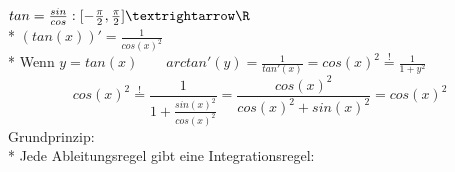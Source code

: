 {%
\bew
$tan=\frac{sin}{cos}:[-\frac{\pi}{2},\frac{\pi}{2}]→\R$\\*
$(tan(x))'=\frac{1}{cos(x)^2}$\\*
Wenn $y=tan(x)\qquad arctan'(y) = \frac{1}{tan'(x)}=cos(x)^2 \overset{!}{=} \frac{1}{1+y^2}$
$$cos(x)^2 \overset{!}{=} \frac{1}{1+\frac{sin(x)^2}{cos(x)^2}}=\frac{cos(x)^2}{cos(x)^2+sin(x)^2}=cos(x)^2$$\ok
}
Grundprinzip:\\*
Jede Ableitungsregel gibt eine Integrationsregel:


